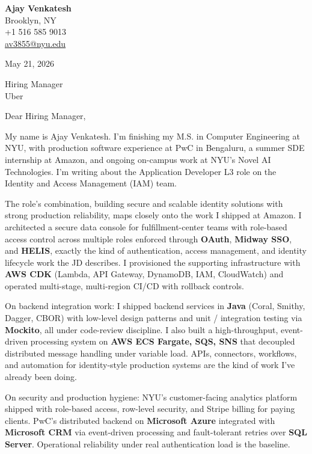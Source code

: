 \documentclass[letterpaper,11pt]{article}
\begin{document}
\begin{flushleft}
\textbf{\large Ajay Venkatesh} \\
Brooklyn, NY \\
+1 516 585 9013 \\
\href{mailto:av3855@nyu.edu}{av3855@nyu.edu}
\end{flushleft}
\vspace{10pt}
May 21, 2026
\vspace{6pt}

Hiring Manager \\
Uber

\vspace{10pt}

Dear Hiring Manager,

My name is Ajay Venkatesh. I'm finishing my M.S. in Computer Engineering at NYU, with production software experience at PwC in Bengaluru, a summer SDE internship at Amazon, and ongoing on-campus work at NYU's Novel AI Technologies. I'm writing about the Application Developer L3 role on the Identity and Access Management (IAM) team.

The role's combination, building secure and scalable identity solutions with strong production reliability, maps closely onto the work I shipped at Amazon. I architected a secure data console for fulfillment-center teams with role-based access control across multiple roles enforced through \textbf{OAuth}, \textbf{Midway SSO}, and \textbf{HELIS}, exactly the kind of authentication, access management, and identity lifecycle work the JD describes. I provisioned the supporting infrastructure with \textbf{AWS CDK} (Lambda, API Gateway, DynamoDB, IAM, CloudWatch) and operated multi-stage, multi-region CI/CD with rollback controls.

On backend integration work: I shipped backend services in \textbf{Java} (Coral, Smithy, Dagger, CBOR) with low-level design patterns and unit / integration testing via \textbf{Mockito}, all under code-review discipline. I also built a high-throughput, event-driven processing system on \textbf{AWS ECS Fargate, SQS, SNS} that decoupled distributed message handling under variable load. APIs, connectors, workflows, and automation for identity-style production systems are the kind of work I've already been doing.

On security and production hygiene: NYU's customer-facing analytics platform shipped with role-based access, row-level security, and Stripe billing for paying clients. PwC's distributed backend on \textbf{Microsoft Azure} integrated with \textbf{Microsoft CRM} via event-driven processing and fault-tolerant retries over \textbf{SQL Server}. Operational reliability under real authentication load is the baseline.
\end{document}
